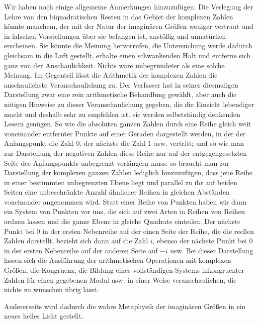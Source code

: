 Wir haben noch einige allgemeine Anmerkungen hinzuzufügen. Die Verlegung der Lehre von den biquadratischen Resten in das Gebiet der komplexen Zahlen könnte manchem, der mit der Natur der imaginären Größen weniger vertraut und in falschen Vorstellungen über sie befangen ist, anstößig und unnatürlich erscheinen. Sie könnte die Meinung hervorrufen, die Untersuchung werde dadurch gleichsam in die Luft gestellt, erhalte einen schwankenden Halt und entferne sich ganz von der Anschaulichkeit. Nichts wäre unbegründeter als eine solche Meinung. Im Gegenteil lässt die Arithmetik der komplexen Zahlen die anschaulichste Veranschaulichung zu. Der Verfasser hat in seiner diesmaligen Darstellung zwar eine rein arithmetische Behandlung gewählt, aber auch die nötigen Hinweise zu dieser Veranschaulichung gegeben, die die Einsicht lebendiger macht und deshalb sehr zu empfehlen ist. sie werden selbstständig denkenden Lesern genügen. So wie die absoluten ganzen Zahlen durch eine Reihe gleich weit voneinander entfernter Punkte auf einer Geraden dargestellt werden, in der der Anfangspunkt die Zahl $0$, der nächste die Zahl $1$ usw. vertritt; und so wie man zur Darstellung der negativen Zahlen diese Reihe nur auf der entgegengesetzten Seite des Anfangspunkts unbegrenzt verlängern muss: so braucht man zur Darstellung der komplexen ganzen Zahlen lediglich hinzuzufügen, dass jene Reihe in einer bestimmten unbegrenzten Ebene liegt und parallel zu ihr auf beiden Seiten eine unbeschränkte Anzahl ähnlicher Reihen in gleichen Abständen voneinander angenommen wird. Statt einer Reihe von Punkten haben wir dann ein System von Punkten vor uns, die sich auf zwei Arten in Reihen von Reihen ordnen lassen und die ganze Ebene in gleiche Quadrate einteilen. Der nächste Punkt bei $0$ in der ersten Nebenreihe auf der einen Seite der Reihe, die die reellen Zahlen darstellt, bezieht sich dann auf die Zahl $i$, ebenso der nächste Punkt bei $0$ in der ersten Nebenreihe auf der anderen Seite auf $-i$ usw. Bei dieser Darstellung lassen sich die Ausführung der arithmetischen Operationen mit komplexen Größen, die Kongruenz, die Bildung eines vollständigen Systems inkongruenter Zahlen für einen gegebenen Modul usw. in einer Weise veranschaulichen, die nichts zu wünschen übrig lässt.

Andererseits wird dadurch die wahre Metaphysik der imaginären Größen in ein neues helles Licht gestellt.

